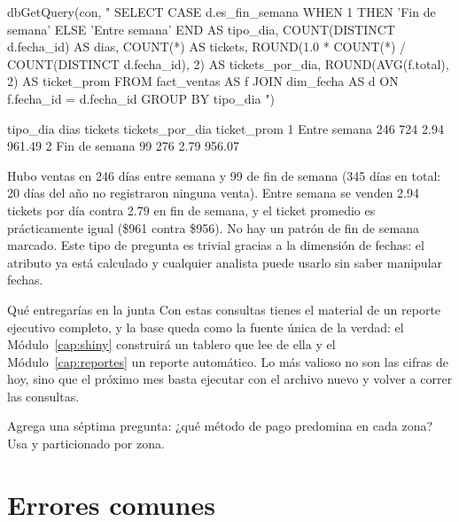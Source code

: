 \begin{rcode}
dbGetQuery(con, "
  SELECT CASE d.es_fin_semana WHEN 1 THEN 'Fin de semana'
                              ELSE 'Entre semana' END AS tipo_dia,
         COUNT(DISTINCT d.fecha_id)                    AS dias,
         COUNT(*)                                      AS tickets,
         ROUND(1.0 * COUNT(*) / COUNT(DISTINCT d.fecha_id), 2)
                                                  AS tickets_por_dia,
         ROUND(AVG(f.total), 2)                        AS ticket_prom
  FROM fact_ventas AS f
  JOIN dim_fecha AS d ON f.fecha_id = d.fecha_id
  GROUP BY tipo_dia
")
\end{rcode}

\begin{rsalida}
       tipo_dia dias tickets tickets_por_dia ticket_prom
1  Entre semana  246     724            2.94      961.49
2 Fin de semana   99     276            2.79      956.07
\end{rsalida}

Hubo ventas en 246 días entre semana y 99 de fin de semana (345 días en
total: 20 días del año no registraron ninguna venta). Entre semana se
venden 2.94 tickets por día contra 2.79 en fin de semana, y el ticket
promedio es prácticamente igual (\$961 contra \$956). No hay un patrón de
fin de semana marcado. Este tipo de pregunta es trivial gracias a la dimensión de
fechas: el atributo  ya está calculado y cualquier
analista puede usarlo sin saber manipular fechas.

\begin{negocio}{Qué entregarías en la junta}
Con estas consultas tienes el material de un reporte ejecutivo
completo, y la base  queda como la fuente única
de la verdad: el Módulo~\ref{cap:shiny} construirá un tablero que lee de
ella y el Módulo~\ref{cap:reportes} un reporte automático. Lo más valioso
no son las cifras de hoy, sino que el próximo mes basta ejecutar
 con el archivo nuevo y volver a correr las
consultas.
\end{negocio}

\begin{hazlotu}
Agrega una séptima pregunta: ¿qué método de pago predomina en cada zona?
Usa  y  particionado por
zona.
\end{hazlotu}

\section{Errores comunes}
\label{sec:m5-errores}

